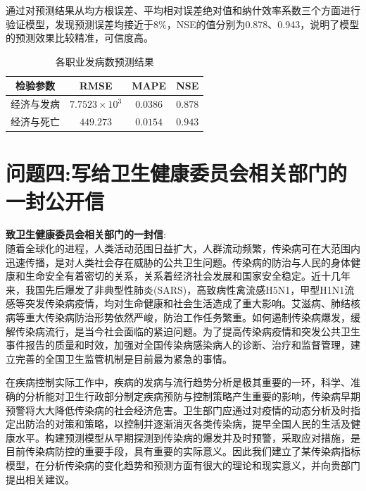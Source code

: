 \documentclass{whutmod}
\begin{document}
     通过对预测结果从均方根误差、平均相对误差绝对值和纳什效率系数三个方面进行验证模型，发现预测误差均接近于8\%，NSE的值分别为0.878、0.943，说明了模型的预测效果比较精准，可信度高。
         \begin{table}[H]
     	\centering\caption{各职业发病数预测结果}\label{zhiye1}
     	\begin{tabular}{cccc}
     		\toprule[1.5pt]
     		\multicolumn{1}{m{2cm}}{\centering 检验参数}
     		& \multicolumn{1}{m{1.8cm}}{\centering RMSE}
     		& \multicolumn{1}{m{1.8cm}}{\centering MAPE}
     		& \multicolumn{1}{m{1.8cm}}{\centering NSE}
     		\\
     		\midrule[0.5pt]	
			经济与发病 &  $7.7523\times10^{3}$&$0.0386$&$0.878$
			\\ 
			经济与死亡 &  $449.273$&$0.0154$&$0.943$\\
     		\bottomrule[1.5pt]	
     	\end{tabular}
     \end{table}
    \section{问题四:写给卫生健康委员会相关部门的一封公开信}
    \textbf{致卫生健康委员会相关部门的一封信}:
    ~\\
    
    随着全球化的进程，人类活动范围日益扩大，人群流动频繁，传染病可在大范围内迅速传播，是对人类社会存在威胁的公共卫生问题。传染病的防治与人民的身体健康和生命安全有着密切的关系，关系着经济社会发展和国家安全稳定。近十几年来，我国先后爆发了非典型性肺炎(SARS)，高致病性禽流感H5N1，甲型H1N1流感等突发传染病疫情，均对生命健康和社会生活造成了重大影响。艾滋病、肺结核病等重大传染病防治形势依然严峻，防治工作任务繁重。如何遏制传染病爆发，缓解传染病流行，是当今社会面临的紧迫问题。为了提高传染病疫情和突发公共卫生事件报告的质量和时效，加强对全国传染病感染病人的诊断、治疗和监督管理，建立完善的全国卫生监管机制是目前最为紧急的事情。
    
    在疾病控制实际工作中，疾病的发病与流行趋势分析是极其重要的一环，科学、准确的分析能对卫生行政部分制定疾病预防与控制策略产生重要的影响，传染病早期预警将大大降低传染病的社会经济危害。卫生部门应通过对疫情的动态分析及时指定出防治的对策和策略，以控制并逐渐消灭各类传染病，提早全国人民的生活及健康水平。构建预测模型从早期探测到传染病的爆发并及时预警，采取应对措施，是目前传染病防控的重要手段，具有重要的实际意义。因此我们建立了某传染病指标模型，在分析传染病的变化趋势和预测方面有很大的理论和现实意义，并向贵部门提出相关建议。
    
\end{document}
